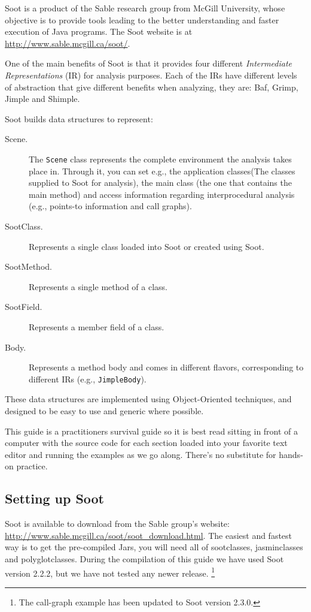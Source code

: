 \documentclass{article}
\newcommand{\code}[1]{\texttt{\small #1}}
\begin{document}
Soot is a product of the Sable research group from McGill University,
whose objective is to provide tools leading to the better
understanding and faster execution of Java programs. The Soot website
is at \url{http://www.sable.mcgill.ca/soot/}.

One of the main benefits of Soot is that it provides four different
\emph{Intermediate Representations} (IR) for analysis purposes. Each
of the IRs have different levels of abstraction that give different
benefits when analyzing, they are: Baf, Grimp, Jimple and Shimple.

Soot builds data structures to represent:
\begin{description}
\item[Scene.] The \code{Scene} class represents the complete
  environment the analysis takes place in. Through it, you can set
  e.g., the application classes(The classes supplied to Soot for
  analysis), the main class (the one that contains the main method)
  and access information regarding interprocedural analysis (e.g.,
  points-to information and call graphs).
\item[SootClass.] Represents a single class loaded into Soot or
created using Soot.
\item[SootMethod.] Represents a single method of a class.
\item[SootField.] Represents a member field of a class.
\item[Body.] Represents a method body and comes in different flavors,
  corresponding to different IRs (e.g., \code{JimpleBody}).
\end{description}
These data structures are implemented using Object-Oriented
techniques, and designed to be easy to use and generic where possible.

This guide is a practitioners survival guide so it is best read
sitting in front of a computer with the source code for each section
loaded into your favorite text editor and running the examples as we
go along. There's no substitute for hands-on practice.

\subsection{Setting up Soot}

Soot is available to download from the Sable group's website:
\url{http://www.sable.mcgill.ca/soot/soot_download.html}. The easiest
and fastest way is to get the pre-compiled Jars, you will need all of
sootclasses, jasminclasses and polyglotclasses. During the compilation
of this guide we have used Soot version 2.2.2, but we have not tested
any newer release. \footnote{The call-graph example has been updated
  to Soot version 2.3.0.}
\end{document}
